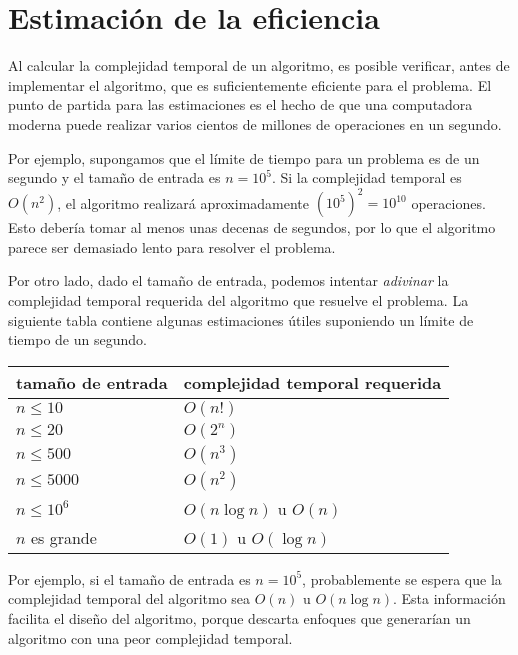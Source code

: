 \section{Estimación de la eficiencia}

Al calcular la complejidad temporal de un algoritmo,
es posible verificar, antes de
implementar el algoritmo, que es
suficientemente eficiente para el problema.
El punto de partida para las estimaciones es el hecho de que
una computadora moderna puede realizar varios cientos de
millones de operaciones en un segundo.

Por ejemplo, supongamos que el límite de tiempo para
un problema es de un segundo y el tamaño de entrada es $n=10^5$.
Si la complejidad temporal es $O(n^2)$,
el algoritmo realizará aproximadamente $(10^5)^2=10^{10}$ operaciones.
Esto debería tomar al menos unas decenas de segundos,
por lo que el algoritmo parece ser demasiado lento para resolver el problema.

Por otro lado, dado el tamaño de entrada,
podemos intentar \emph{adivinar}
la complejidad temporal requerida del algoritmo
que resuelve el problema.
La siguiente tabla contiene algunas estimaciones útiles
suponiendo un límite de tiempo de un segundo.

\begin{center}
    \begin{tabular}{ll}
        tamaño de entrada & complejidad temporal requerida \\
        \hline
        $n \le 10$        & $O(n!)$                        \\
        $n \le 20$        & $O(2^n)$                       \\
        $n \le 500$       & $O(n^3)$                       \\
        $n \le 5000$      & $O(n^2)$                       \\
        $n \le 10^6$      & $O(n \log n)$ u $O(n)$         \\
        $n$ es grande     & $O(1)$ u $O(\log n)$           \\
    \end{tabular}
\end{center}

Por ejemplo, si el tamaño de entrada es $n=10^5$,
probablemente se espera que la complejidad
temporal del algoritmo sea $O(n)$ u $O(n \log n)$.
Esta información facilita el diseño del algoritmo,
porque descarta enfoques que generarían
un algoritmo con una peor complejidad temporal.

